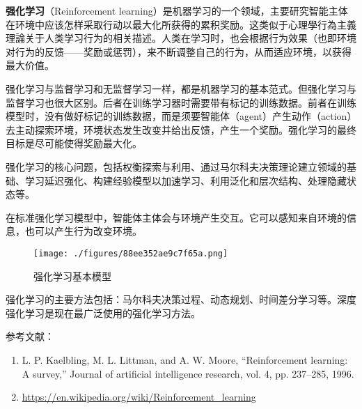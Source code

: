 
\textbf{强化学习}（Reinforcement learning）是机器学习的一个领域，主要研究智能主体在环境中应该怎样采取行动以最大化所获得的累积奖励。这类似于心理學行為主義理論关于人类学习行为的相关描述。人类在学习时，也会根据行为效果（也即环境对行为的反馈——奖励或惩罚），来不断调整自己的行为，从而适应环境，以获得最大价值。

强化学习与监督学习和无监督学习一样，都是机器学习的基本范式。但强化学习与监督学习也很大区别。后者在训练学习器时需要带有标记的训练数据。前者在训练模型时，没有做好标记的训练数据，而是须要智能体（agent）产生动作（action）去主动探索环境，环境状态发生改变并给出反馈，产生一个奖励。强化学习的最终目标是尽可能使得奖励最大化。

强化学习的核心问题，包括权衡探索与利用、通过马尔科夫决策理论建立领域的基础、学习延迟强化、构建经验模型以加速学习、利用泛化和层次结构、处理隐藏状态等。

在标准强化学习模型中，智能体主体会与环境产生交互。它可以感知来自环境的信息，也可以产生行为改变环境。

\begin{figure}[ht]
\centering
\texttt{[image: ./figures/88ee352ae9c7f65a.png]}
\caption{强化学习基本模型} \label{fig_rl_1}
\end{figure}

强化学习的主要方法包括：马尔科夫决策过程、动态规划、时间差分学习等。深度强化学习是现在最广泛使用的强化学习方法。



参考文献：
\begin{enumerate}
\item L. P. Kaelbling, M. L. Littman, and A. W. Moore, “Reinforcement learning: A survey,” Journal of artificial intelligence research, vol. 4, pp. 237–285, 1996.
\item \href{https://en.wikipedia.org/wiki/Reinforcement\_learning}{https://en.wikipedia.org/wiki/Reinforcement\_learning}
\end{enumerate}
